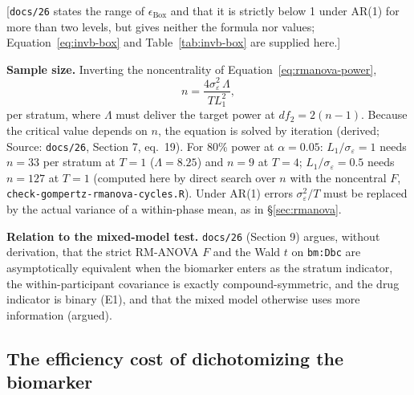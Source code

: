 \documentclass[11pt]{article}
\newcommand{\note}[1]{\textcolor{blue!60!black}{\small [#1]}}
\newcommand{\code}[1]{\texttt{#1}}
\begin{document}
\note{\code{docs/26} states the range of $\epsilon_{\mathrm{Box}}$ and
that it is strictly below 1 under AR(1) for more than two levels, but
gives neither the formula nor values; Equation~\eqref{eq:invb-box} and
Table~\ref{tab:invb-box} are supplied here.}

\textbf{Sample size.} Inverting the noncentrality of
Equation~\eqref{eq:rmanova-power},
\begin{equation}
n = \frac{4\sigma_\varepsilon^2\,\Lambda}{T L_1^2},
\label{eq:invb-rmanova-n}
\end{equation}
per stratum, where $\Lambda$ must deliver the target power at
$df_2 = 2(n-1)$. Because the critical value depends on $n$, the
equation is solved by iteration (derived; Source: \code{docs/26},
Section 7, eq.~19). For 80\% power at $\alpha = 0.05$: $L_1 /
\sigma_\varepsilon = 1$ needs $n = 33$ per stratum at $T = 1$
($\Lambda = 8.25$) and $n = 9$ at $T = 4$; $L_1/\sigma_\varepsilon =
0.5$ needs $n = 127$ at $T = 1$ (computed here by direct search over
$n$ with the noncentral $F$, \code{check-gompertz-rmanova-cycles.R}). Under AR(1)
errors $\sigma_\varepsilon^2/T$ must be replaced by the actual
variance of a within-phase mean, as in \S\ref{sec:rmanova}.

\textbf{Relation to the mixed-model test.} \code{docs/26} (Section 9)
argues, without derivation, that the strict RM-ANOVA $F$ and the Wald
$t$ on \code{bm:Dbc} are asymptotically equivalent when the biomarker
enters as the stratum indicator, the within-participant covariance is
exactly compound-symmetric, and the drug indicator is binary (E1),
and that the mixed model otherwise uses more information (argued).

\subsection{The efficiency cost of dichotomizing the biomarker}
\label{sec:inva-dichot}
\end{document}
